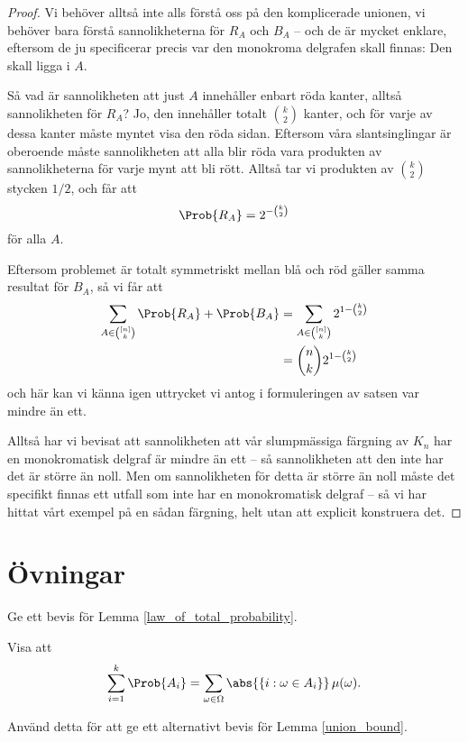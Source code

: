 \documentclass[nobib]{tufte-handout}
\begin{document}
\begin{proposition}
\begin{proof}
        Vi behöver alltså inte alls förstå oss på den komplicerade unionen, vi behöver bara förstå sannolikheterna för $R_A$ och $B_A$ -- och de är mycket enklare, eftersom de ju specificerar precis var den monokroma delgrafen skall finnas: Den skall ligga i $A$.

        Så vad är sannolikheten att just $A$ innehåller enbart röda kanter, alltså sannolikheten för $R_A$? Jo, den innehåller totalt $\binom{k}{2}$ kanter, och för varje av dessa kanter måste myntet visa den röda sidan. Eftersom våra slantsinglingar är oberoende måste sannolikheten att alla blir röda vara produkten av sannolikheterna för varje mynt att bli rött. Alltså tar vi produkten av $\binom{k}{2}$ stycken $1/2$, och får att
        $$\Prob{R_A} = 2^{-\binom{k}{2}}$$
        för alla $A$. 
        
        Eftersom problemet är totalt symmetriskt mellan blå och röd gäller samma resultat för $B_A$, så vi får att
        \begin{align*}
            \sum_{A\in \binom{[n]}{k}} \Prob{R_A} + \Prob{B_A} &= \sum_{A\in \binom{[n]}{k}} 2^{1-\binom{k}{2}}\\
            &= \binom{n}{k}2^{1-\binom{k}{2}}
        \end{align*}
        och här kan vi känna igen uttrycket vi antog i formuleringen av satsen var mindre än ett.

        Alltså har vi bevisat att sannolikheten att vår slumpmässiga färgning av $K_n$ har en monokromatisk delgraf är mindre än ett -- så sannolikheten att den inte har det är större än noll. Men om sannolikheten för detta är större än noll måste det specifikt finnas ett utfall som inte har en monokromatisk delgraf -- så vi har hittat vårt exempel på en sådan färgning, helt utan att explicit konstruera det.
    \end{proof}
\end{proposition}

\section{Övningar}

\begin{xca}
    Ge ett bevis för Lemma \ref{law_of_total_probability}.
\end{xca}

\begin{xca}
    Visa att
    $$\sum_{i=1}^{k} \Prob{A_i} = \sum_{\omega \in \Omega} \abs{\left\{i: \omega \in A_i\right\}}\,\mu(\omega).$$

    Använd detta för att ge ett alternativt bevis för Lemma \ref{union_bound}.
\end{xca}

%
%
\end{document}
